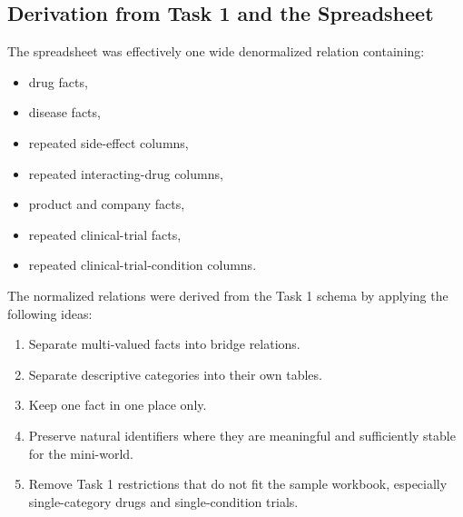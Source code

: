 \documentclass[12pt,a4paper]{article}
\begin{document}
\subsection{Derivation from Task 1 and the Spreadsheet}
The spreadsheet was effectively one wide denormalized relation containing:

\begin{itemize}[leftmargin=1.5em]
    \item drug facts,
    \item disease facts,
    \item repeated side-effect columns,
    \item repeated interacting-drug columns,
    \item product and company facts,
    \item repeated clinical-trial facts,
    \item repeated clinical-trial-condition columns.
\end{itemize}

The normalized relations were derived from the Task 1 schema by applying the following ideas:

\begin{enumerate}[leftmargin=1.5em]
    \item Separate multi-valued facts into bridge relations.
    \item Separate descriptive categories into their own tables.
    \item Keep one fact in one place only.
    \item Preserve natural identifiers where they are meaningful and sufficiently stable for the mini-world.
    \item Remove Task 1 restrictions that do not fit the sample workbook, especially single-category drugs and single-condition trials.
\end{enumerate}
\end{document}
